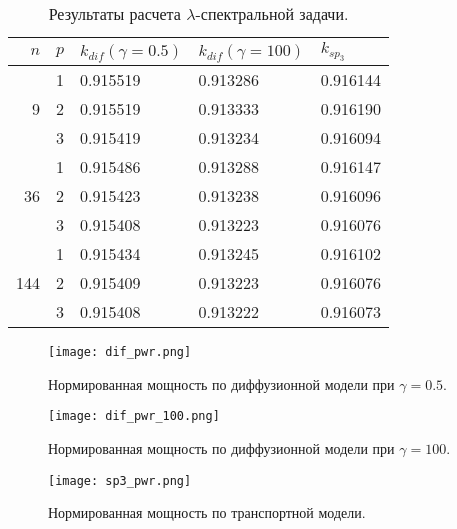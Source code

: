 \documentclass[a4paper,12pt]{article}
\begin{document}
\begin{table}[h]
\caption{Результаты расчета $\lambda$-спектральной задачи.}
\label{table:t2-lamda}
\begin{center}
\begin{tabular}{r r R{2.5cm} R{2.5cm} R{2.5cm}}
\hline
$n$ & $p$ & $k_{dif} (\gamma=0.5)$ & $k_{dif} (\gamma=100)$ & $k_{sp_3}$\\
\hline
	& 1	& 0.915519 & 0.913286 & 0.916144\\
9	& 2	& 0.915519 & 0.913333 & 0.916190\\
	& 3	& 0.915419 & 0.913234 & 0.916094\\ 
\hline
	& 1	& 0.915486 & 0.913288 & 0.916147\\
36& 2	& 0.915423 & 0.913238 & 0.916096\\
	& 3	& 0.915408 & 0.913223 & 0.916076\\ 
\hline
	& 1	& 0.915434 & 0.913245 & 0.916102\\
144& 2	& 0.915409 & 0.913223 & 0.916076\\
	& 3	& 0.915408 & 0.913222 & 0.916073\\
\hline
\end{tabular}
\end{center}
\end{table}

\begin{figure}[htp]
\begin{center}
	\texttt{[image: dif\_pwr.png]}\\
	\caption{\label{image:canonsummary} Нормированная мощность по диффузионной модели при $\gamma=0.5$.}
	\label{ris:dif_pwr_0.5}
\end{center}
\end{figure}

\begin{figure}[htp]
\begin{center}
	\texttt{[image: dif\_pwr\_100.png]}\\
	\caption{\label{image:canonsummary} Нормированная мощность по диффузионной модели при $\gamma=100$.}
	\label{ris:dif_pwr_100}
\end{center}
\end{figure}

\begin{figure}[htp]
\begin{center}
	\texttt{[image: sp3\_pwr.png]}\\
	\caption{\label{image:canonsummary} Нормированная мощность по транспортной модели.}
	\label{ris:sp3_pwr}
\end{center}
\end{figure}
\end{document}
